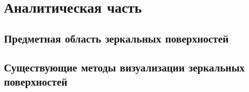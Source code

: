 \chapter{Аналитическая часть}

\section{Предметная область зеркальных поверхностей}

\section{Существующие методы визуализации зеркальных поверхностей}